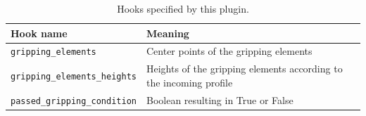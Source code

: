 \documentclass[11pt]{PyRollDocs}
\begin{document}
    \begin{table}[h]
        \centering
        \caption{Hooks specified by this plugin.}
        \label{tab:hookspecs}
        \begin{tabular}{ll}
            \toprule
            Hook name                            & Meaning                                                            \\
            \midrule
            \texttt{gripping\_elements}          & Center points of the gripping elements                             \\
            \texttt{gripping\_elements\_heights} & Heights of the gripping elements according to the incoming profile \\
            \texttt{passed\_gripping\_condition} & Boolean resulting in True or False                                 \\
            \bottomrule
        \end{tabular}
    \end{table}
\end{document}
